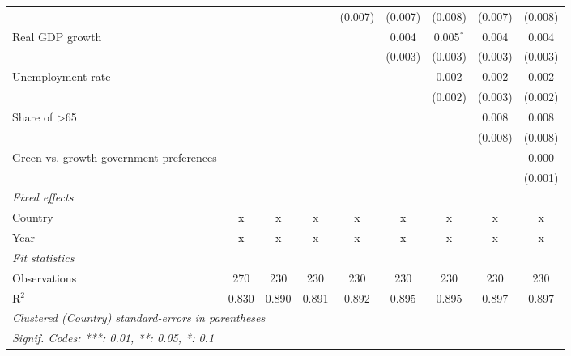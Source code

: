 \begin{table}[htbp]
\begin{tabular}{lcccccccc}
                                              &         &              &         & (0.007) & (0.007) & (0.008)     & (0.007)     & (0.008)\\   
      Real GDP growth                         &         &              &         &         & 0.004   & 0.005$^{*}$ & 0.004       & 0.004\\   
                                              &         &              &         &         & (0.003) & (0.003)     & (0.003)     & (0.003)\\   
      Unemployment rate                       &         &              &         &         &         & 0.002       & 0.002       & 0.002\\   
                                              &         &              &         &         &         & (0.002)     & (0.003)     & (0.002)\\   
      Share of >65                            &         &              &         &         &         &             & 0.008       & 0.008\\   
                                              &         &              &         &         &         &             & (0.008)     & (0.008)\\   
      Green vs. growth government preferences &         &              &         &         &         &             &             & 0.000\\   
                                              &         &              &         &         &         &             &             & (0.001)\\   
      \emph{Fixed effects}\\
      Country                                 & x       & x            & x       & x       & x       & x           & x           & x\\  
      Year                                    & x       & x            & x       & x       & x       & x           & x           & x\\  
      \midrule \emph{Fit statistics}\\
      Observations                            & 270     & 230          & 230     & 230     & 230     & 230         & 230         & 230\\  
      R$^2$                                   & 0.830   & 0.890        & 0.891   & 0.892   & 0.895   & 0.895       & 0.897       & 0.897\\  
      \midrule
      \multicolumn{9}{l}{\emph{Clustered (Country) standard-errors in parentheses}}\\
      \multicolumn{9}{l}{\emph{Signif. Codes: ***: 0.01, **: 0.05, *: 0.1}}\\
   \end{tabular}
\end{table}


